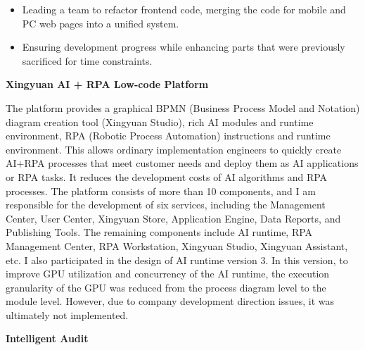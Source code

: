 \documentclass[a4paper]{article}
\newenvironment{changemargin}[2]{%
  \begin{list}{}{%
    \setlength{\topsep}{0pt}%
    \setlength{\leftmargin}{#1}%
    \setlength{\rightmargin}{#2}%
    \setlength{\listparindent}{\parindent}%
    \setlength{\itemindent}{\parindent}%
    \setlength{\parsep}{\parskip}%
  }%
  \item[]}{\end{list}
}
\newenvironment{body} {
	\vspace*{-16pt}
	\begin{changemargin}{-0.5in}{-0.5in}
  }
	{\end{changemargin}
}
\begin{document}
\begin{body}
	\vspace*{-8pt}
	\begin{itemize} \itemsep -0pt  %
		\item \begin{justify} 
			Leading a team to refactor frontend code, merging the code for mobile and PC web pages into a unified system.
		\end{justify} 
	\end{itemize}

	\vspace*{-8pt}
	\begin{itemize} \itemsep -0pt  %
		\item \begin{justify} 
			Ensuring development progress while enhancing parts that were previously sacrificed for time constraints.
		\end{justify} 
	\end{itemize}
	
	\medskip

	\textbf{Xingyuan AI + RPA Low-code Platform} \\

	\begin{justify} 
		The platform provides a graphical BPMN (Business Process Model and Notation) diagram creation tool (Xingyuan Studio), rich AI modules and runtime environment, RPA (Robotic Process Automation) instructions and runtime environment. This allows ordinary implementation engineers to quickly create AI+RPA processes that meet customer needs and deploy them as AI applications or RPA tasks. It reduces the development costs of AI algorithms and RPA processes. The platform consists of more than 10 components, and I am responsible for the development of six services, including the Management Center, User Center, Xingyuan Store, Application Engine, Data Reports, and Publishing Tools. The remaining components include AI runtime, RPA Management Center, RPA Workstation, Xingyuan Studio, Xingyuan Assistant, etc. I also participated in the design of AI runtime version 3. In this version, to improve GPU utilization and concurrency of the AI runtime, the execution granularity of the GPU was reduced from the process diagram level to the module level. However, due to company development direction issues, it was ultimately not implemented.
	\end{justify} 
	
	\medskip

	\textbf{Intelligent Audit} \\


\end{body}
\end{document}
